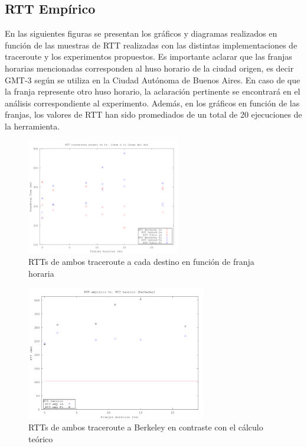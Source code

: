 \subsection{RTT Empírico}

En las siguientes figuras se presentan los gráficos y diagramas realizados en función de las muestras de RTT realizadas con las distintas implementaciones de traceroute y los experimentos propuestos. Es importante aclarar que las franjas horarias mencionadas corresponden al huso horario de la ciudad origen, es decir GMT-3 según se utiliza en la Ciudad Autónoma de Buenos Aires. En caso de que la franja represente otro huso horario, la aclaración pertinente se encontrará en el análisis correspondiente al experimento. Además, en los gráficos en función de las franjas, los valores de RTT han sido promediados de un total de 20 ejecuciones de la herramienta.

\begin{figure}[h!]
  \centering
  \includegraphics[width=0.6\textwidth]{./figs/franjasTR_py_vs_linux.png}
  \caption{RTTs de ambos traceroute a cada destino en función de franja horaria}
  \label{fig:frajasTR_py_lin}
\end{figure}

\clearpage

\begin{figure}[h!]
  \centering
  \includegraphics[width=0.7\textwidth]{./figs/rtt_emp_vs_teo_berkeley.png}
  \caption{RTTs de ambos traceroute a Berkeley en contraste con el cálculo teórico}
  \label{fig:emp_vs_teo_berk}
\end{figure}

